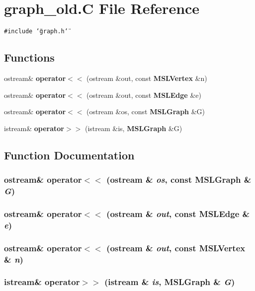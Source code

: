 \section{graph\_\-old.C File Reference}
\label{graph__old_8C}
{\tt \#include \char`\"{}graph.h\char`\"{}}\par
\subsection*{Functions}
\begin{CompactItemize}
\item 
ostream\& {\bf operator$<$$<$} (ostream \&out, const {\bf MSLVertex} \&n)
\item 
ostream\& {\bf operator$<$$<$} (ostream \&out, const {\bf MSLEdge} \&e)
\item 
ostream\& {\bf operator$<$$<$} (ostream \&os, const {\bf MSLGraph} \&G)
\item 
istream\& {\bf operator$>$$>$} (istream \&is, {\bf MSLGraph} \&G)
\end{CompactItemize}


\subsection{Function Documentation}
\subsubsection{\setlength{\rightskip}{0pt plus 5cm}ostream\& operator$<$$<$ (ostream \& {\em os}, const {\bf MSLGraph} \& {\em G})}\label{graph__old_8C_a2}


\subsubsection{\setlength{\rightskip}{0pt plus 5cm}ostream\& operator$<$$<$ (ostream \& {\em out}, const {\bf MSLEdge} \& {\em e})}\label{graph__old_8C_a1}


\subsubsection{\setlength{\rightskip}{0pt plus 5cm}ostream\& operator$<$$<$ (ostream \& {\em out}, const {\bf MSLVertex} \& {\em n})}\label{graph__old_8C_a0}


\subsubsection{\setlength{\rightskip}{0pt plus 5cm}istream\& operator$>$$>$ (istream \& {\em is}, {\bf MSLGraph} \& {\em G})}\label{graph__old_8C_a3}


